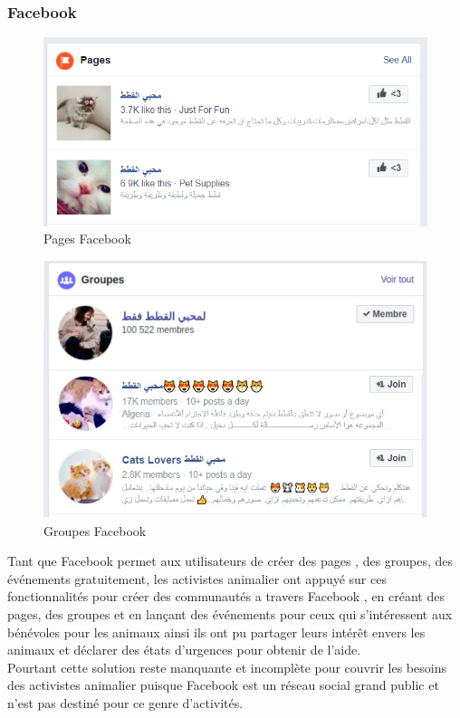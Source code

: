 \documentclass[11pt,a4paper,oneside]{book}
\begin{document}
	\subsubsection{Facebook}
	\begin{figure}[H]
		\centering
		\includegraphics[width=1\linewidth]{Images/Ch1/1}
		\caption{Pages Facebook}
		\label{fig:1}
	\end{figure}

	\begin{figure}[H]
		\centering
		\includegraphics[width=1\linewidth]{Images/Ch1/2}
		\caption{Groupes Facebook}
		\label{fig:2}
	\end{figure}
	Tant que Facebook permet aux utilisateurs de créer des pages , des groupes, des événements gratuitement, les activistes animalier ont appuyé sur ces fonctionnalités pour créer des communautés a travers Facebook , en créant des pages, des groupes et en lançant des événements  pour ceux qui s'intéressent aux bénévoles pour les animaux ainsi ils ont pu partager leurs intérêt envers les animaux et déclarer des états d’urgences pour obtenir de l’aide.\\ Pourtant cette solution reste manquante et incomplète pour couvrir les besoins des activistes animalier puisque Facebook est un réseau social grand public et n’est pas destiné pour ce genre d'activités.
\end{document}
